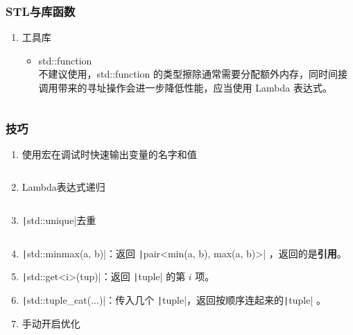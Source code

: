 \documentclass[a4paper, twoside]{article}
\begin{document}
    \subsubsection{STL与库函数}
    \begin{enumerate}
        \item 工具库
        \begin{itemize}
            \item std::function\\
            不建议使用，std::function 的类型擦除通常需要分配额外内存，同时间接调用带来的寻址操作会进一步降低性能，应当使用 Lambda 表达式。
            \inputminted{cpp}{../src/附录/C++/std::function.cpp}
        \end{itemize}
    \end{enumerate}
    \subsubsection{技巧}
    \begin{enumerate}
        \item 使用宏在调试时快速输出变量的名字和值
        \inputminted{cpp}{../src/附录/C++/debug宏.cpp}
        \item Lambda表达式递归
        \inputminted{cpp}{../src/附录/C++/Lambda表达式递归.cpp}
        \item \texttt|std::unique|去重
        \inputminted{cpp}{../src/附录/C++/std::unique去重.cpp}
        \item \texttt|std::minmax(a, b)|：返回 \texttt|pair<min(a, b), max(a, b)>| ，返回的是\textbf{引用}。
        \item \texttt|std::get<i>(tup)|：返回 \texttt|tuple| 的第 $i$ 项。
        \item \texttt|std::tuple_cat(...)|：传入几个 \texttt|tuple|，返回按顺序连起来的\texttt|tuple| 。
        \item 手动开启优化
        \inputminted{cpp}{../src/附录/C++/手动开启优化.cpp}

    \end{enumerate}
    
\end{document}
